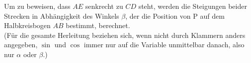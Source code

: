 \setlength{\mathindent}{4cm}

\newcommand{\Koordinaten}{
	\coordinate (m) at (0,0);
	\coordinate (a) at (-1,0);
	\coordinate (b) at (1,0);
	\coordinate (c) at (-0.5,0.866);
	\coordinate (p) at (0.5,0.866);
	\coordinate (e) at (0.866,0.5);
}
\newcommand{\Halbkreis}{
	\begin{scope}
		\clip (a) rectangle (1,1);
		\draw[black] (m) circle(1);
		\draw[black] (a) -- (b);
	\end{scope}
}

\newcommand{\Strecke}[1]{\overline{\mathit{#1}}}

\newcommand{\sina}{\sin\alpha}
\newcommand{\cosa}{\cos\alpha}
\newcommand{\sinb}{\sin\beta}
\newcommand{\cosb}{\cos\beta}

Um zu beweisen, dass $AE$ senkrecht zu $CD$ steht, werden die Steigungen beider Strecken in Abhängigkeit des Winkels $\beta$, der die Position von P auf dem Halbkreisbogen $AB$ bestimmt, berechnet.
\\[10pt]
(Für die gesamte Herleitung beziehen sich, wenn nicht durch Klammern anders angegeben, $\sin$ und $\cos$ immer nur auf die Variable unmittelbar danach, also nur $\alpha$ oder $\beta$.)

